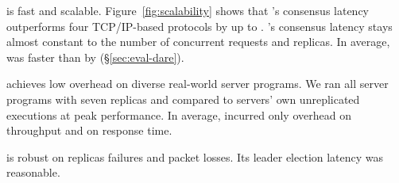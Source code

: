 \begin{tightenum}

\item \xxx is fast and scalable. Figure~\ref{fig:scalability} shows that \xxx's 
consensus latency outperforms four TCP/IP-based \paxos protocols by up
to \comptradhigh. \xxx's consensus latency stays almost constant to the number 
of concurrent requests and replicas. In average, \xxx was faster than \dare by 
\fasterDARE (\S\ref{sec:eval-dare}).



\item \xxx achieves low overhead on diverse real-world server programs. We ran 
all \nprog server programs with seven replicas and compared to servers' own 
unreplicated executions at peak performance. In average, \xxx incurred only 
\tputoverhead overhead on throughput and \latencyoverhead on response time.
 
\item \xxx is robust on replicas failures and packet losses. Its leader 
election latency was reasonable.



\end{tightenum}








